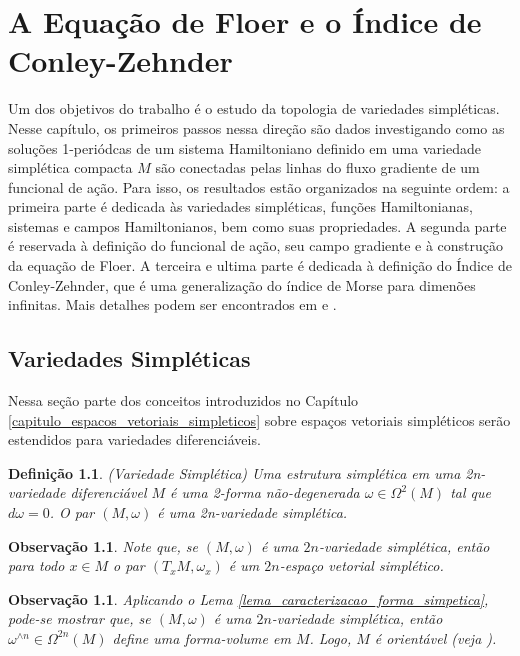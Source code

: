 \documentclass[12pt]{book}
\newtheorem{definicao}[teorema]{Definição}
\newtheorem{observacao}[teorema]{Observação}
\begin{document}
	\chapter{A Equação de Floer e o Índice de Conley-Zehnder}\label{capitulo_equacao_floer}
	
	Um dos objetivos do trabalho é o estudo da topologia de variedades simpléticas. Nesse capítulo, os primeiros passos nessa direção são dados investigando como as soluções 1-periódcas de um sistema Hamiltoniano definido em uma variedade simplética compacta $M$ são conectadas pelas linhas do fluxo gradiente de um funcional de ação. Para isso, os resultados estão organizados na seguinte ordem: a primeira parte é dedicada às variedades simpléticas, funções Hamiltonianas, sistemas e campos Hamiltonianos, bem como suas propriedades. A segunda parte é reservada à definição do funcional de ação, seu campo gradiente e à construção da equação de Floer. A terceira e ultima parte é dedicada à definição do Índice de Conley-Zehnder, que é uma generalização do índice de Morse para dimenões infinitas. Mais detalhes podem ser encontrados em \cite{audi_floer_homology} e \cite{salamon_zehnder}.
	
	\section{Variedades Simpléticas}\label{secao_variedade_simpletica}
	
	Nessa seção parte dos conceitos introduzidos no Capítulo \ref{capitulo_espacos_vetoriais_simpleticos} sobre espaços vetoriais simpléticos serão estendidos para variedades diferenciáveis.
	
	\begin{definicao}
		(Variedade Simplética) Uma estrutura simplética em uma 2n-variedade diferenciável $M$ é uma 2-forma não-degenerada $\omega\in \Omega^{2}(M)$ tal que $d\omega=0$. O par $(M, \omega)$ é uma 2n-variedade simplética.
	\end{definicao}
	
	\begin{observacao}
		Note que, se $(M, \omega)$ é uma $2n$-variedade simplética, então para todo $x \in M$ o par $(T_{x}M, \omega_{x})$ é um $2n$-espaço vetorial simplético.
	\end{observacao}
	
	\begin{observacao}
		Aplicando o Lema \ref{lema_caracterizacao_forma_simpetica}, pode-se mostrar que, se $(M, \omega)$ é uma $2n$-variedade simplética, então $\omega^{\wedge n} \in \Omega^{2n}(M)$ define uma forma-volume em $M$. Logo, $M$ é orientável (veja \cite{warner_manifolds}).
	\end{observacao}
	
\end{document}
